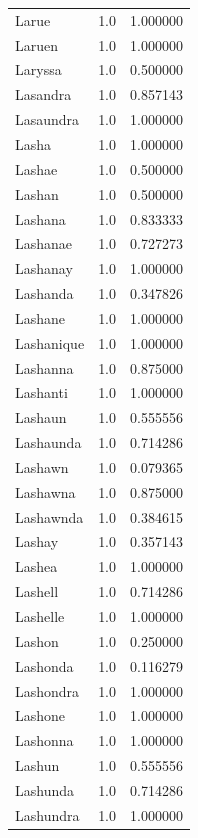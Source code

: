 \documentclass[
  letterpaper,
  DIV=11,
  numbers=noendperiod]{scrreprt}
\begin{document}
\begin{tabular}{lrr}
Larue           &   1.0 &   1.000000 \\
Laruen          &   1.0 &   1.000000 \\
Laryssa         &   1.0 &   0.500000 \\
Lasandra        &   1.0 &   0.857143 \\
Lasaundra       &   1.0 &   1.000000 \\
Lasha           &   1.0 &   1.000000 \\
Lashae          &   1.0 &   0.500000 \\
Lashan          &   1.0 &   0.500000 \\
Lashana         &   1.0 &   0.833333 \\
Lashanae        &   1.0 &   0.727273 \\
Lashanay        &   1.0 &   1.000000 \\
Lashanda        &   1.0 &   0.347826 \\
Lashane         &   1.0 &   1.000000 \\
Lashanique      &   1.0 &   1.000000 \\
Lashanna        &   1.0 &   0.875000 \\
Lashanti        &   1.0 &   1.000000 \\
Lashaun         &   1.0 &   0.555556 \\
Lashaunda       &   1.0 &   0.714286 \\
Lashawn         &   1.0 &   0.079365 \\
Lashawna        &   1.0 &   0.875000 \\
Lashawnda       &   1.0 &   0.384615 \\
Lashay          &   1.0 &   0.357143 \\
Lashea          &   1.0 &   1.000000 \\
Lashell         &   1.0 &   0.714286 \\
Lashelle        &   1.0 &   1.000000 \\
Lashon          &   1.0 &   0.250000 \\
Lashonda        &   1.0 &   0.116279 \\
Lashondra       &   1.0 &   1.000000 \\
Lashone         &   1.0 &   1.000000 \\
Lashonna        &   1.0 &   1.000000 \\
Lashun          &   1.0 &   0.555556 \\
Lashunda        &   1.0 &   0.714286 \\
Lashundra       &   1.0 &   1.000000 \\

\end{tabular}
\end{document}
